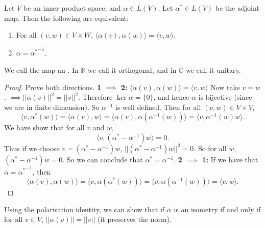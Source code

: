 \documentclass[a4paper]{scrartcl}
\begin{document}
\begin{proposition}
     Let $V$ be an inner product space, and $\alpha \in L (V)$. Let $\alpha^* \in L (V)$ be the adjoint map. Then the following are equivalent:
     \begin{enumerate}
          \item For all $(v,w) \in V \times W$, $\langle \alpha (v), \alpha (w)\rangle =\langle v,w \rangle $.
          \item $\alpha={\alpha^*}^{-1}$.
     \end{enumerate}
     We call the map an . In $\mathbb{R}$ we call it orthogonal, and in $\mathbb{C}$ we call it unitary.
\end{proposition}
\begin{proof}
      Prove both directions.\newline 
      \textbf{1 $\implies$ 2:}\newline 
      $\langle \alpha (v), \alpha (w) \rangle =\langle v,w \rangle$ 
      Now take $v=w$. $\implies ||\alpha (v)||^2=||v||^2$. Therefore $\operatorname{ker} \alpha=\{0\}$, and hence $\alpha$ is bijective (since we are in finite dimension). So ${\alpha}^{-1}$ is well defined. Then for all $(v,w)\in V \times V$, 
      \[\langle v,\alpha^* (w) \rangle =\langle \alpha (v), w \rangle =\langle \alpha (v), \alpha ({\alpha}^{-1}(w)) \rangle =\langle v,{\alpha}^{-1}(w)w \rangle .\]
      We have show that for all $v$ and $w$, 
      \[\langle v, (\alpha^* - {\alpha}^{-1})w \rangle =0.\]
      Thus if we choose $v=(\alpha^* - {\alpha}^{-1})w$, $||(\alpha^* - {\alpha}^{-1})w||^2=0$. So for all $w$, $(\alpha^* - {\alpha}^{-1})w=0$. So we can conclude that $\alpha^*={\alpha}^{-1}$.\newline 
      \textbf{2 $\implies$ 1:}\newline 
     If we have that $\alpha={\alpha^*}^{-1}$, then 
     \[\langle \alpha (v), \alpha (w) \rangle =\langle v, \alpha (\alpha^* (w)) \rangle=\langle v, \alpha ({\alpha}^{-1} (w)) \rangle= \langle v,w \rangle.\]
\end{proof}
\begin{remark}
      Using the polarisation identity, we can show that if $\alpha$ is an isometry if and only if for all $v \in V$, $||\alpha (v)||=||v||$ (it preserves the norm).
\end{remark}
\end{document}
